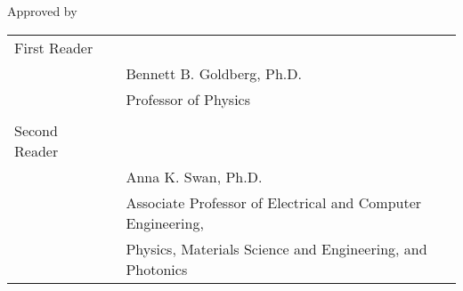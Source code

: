 \begin{titlepage}	%

\begin{center}
Approved by
\end{center}

\vspace{1.5in}

\begin{singlespace}

	\begin{center}
		\begin{tabular}{l c @{} l}
		First Reader 	& & \\ \cline{3-3} 
						& & Bennett B. Goldberg, Ph.D. \\
						& & Professor of Physics \\
		\vspace{0.75in} & & \\
		Second Reader 	& & \\ \cline{3-3}
						& & Anna K. Swan, Ph.D. \\
						& & Associate Professor of Electrical and Computer Engineering, \\
						& & Physics, Materials Science and Engineering, and Photonics
		\end{tabular}
	\end{center}

\end{singlespace}

\end{titlepage}